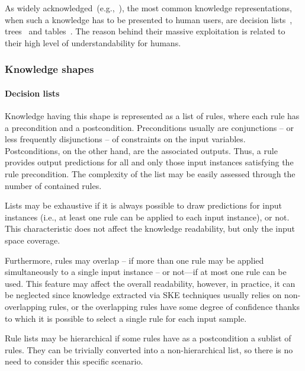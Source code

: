 \documentclass[sigconf]{acmart}
\begin{document}
As widely acknowledged~(e.g.,~\cite{guidotti2018survey}), the most common knowledge representations, when such a knowledge has to be presented to human users, are decision lists~\cite{freitas2014comprehensible,huysmans2011empirical}, trees~\cite{quinlan1993c4,breiman1984classification} and tables~\cite{sethi2012kdruleex}.
%
The reason behind their massive exploitation is related to their high level of understandability for humans.

\subsubsection{Knowledge shapes}

\paragraph{Decision lists}

Knowledge having this shape is represented as a list of rules, where each rule has a precondition and a postcondition.
%
Preconditions usually are conjunctions -- or less frequently disjunctions -- of constraints on the input variables.
%
Postconditions, on the other hand, are the associated outputs.
%
Thus, a rule provides output predictions for all and only those input instances satisfying the rule precondition.
%
The complexity of the list may be easily assessed through the number of contained rules.

Lists may be exhaustive if it is always possible to draw predictions for input instances (i.e., at least one rule can be applied to each input instance), or not.
%
This characteristic does not affect the knowledge readability, but only the input space coverage.

Furthermore, rules may overlap -- if more than one rule may be applied simultaneously to a single input instance -- or not---if at most one rule can be used.
%
This feature may affect the overall readability, however, in practice, it can be neglected since knowledge extracted via SKE techniques usually relies on non-overlapping rules, or the overlapping rules have some degree of confidence thanks to which it is possible to select a single rule for each input sample.

Rule lists may be hierarchical if some rules have as a postcondition a sublist of rules.
%
They can be trivially converted into a non-hierarchical list, so there is no need to consider this specific scenario.
\end{document}

